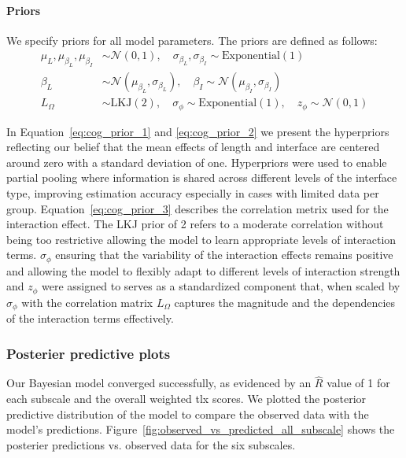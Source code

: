 \paragraph{Priors}
We specify priors for all model parameters. The priors are defined as follows:
\begin{align}
    \mu_{L}, \mu_{\beta_L}, \mu_{\beta_I} &\sim \mathcal{N}(0, 1), \quad \sigma_{\beta_L}, \sigma_{\beta_I} \sim \text{Exponential}(1) \label{eq:cog_prior_1} \\
    \beta_L &\sim \mathcal{N}(\mu_{\beta_L}, \sigma_{\beta_L}), \quad \beta_I \sim \mathcal{N}(\mu_{\beta_I}, \sigma_{\beta_I}) \label{eq:cog_prior_2} \\
    L_{\Omega} &\sim \text{LKJ}(2), \quad \sigma_{\phi} \sim \text{Exponential}(1), \quad z_{\phi} \sim \mathcal{N}(0, 1) \label{eq:cog_prior_3} 
\end{align}

In Equation~\ref{eq:cog_prior_1} and \ref{eq:cog_prior_2} we present the hyperpriors reflecting our belief that the mean effects of length and interface are centered around zero with a standard deviation of one. Hyperpriors were used to enable partial pooling where information is shared across different levels of the interface type, improving estimation accuracy especially in cases with limited data per group. Equation~\ref{eq:cog_prior_3} describes the correlation metrix used for the interaction effect. The LKJ prior of 2 refers to a moderate correlation without being too restrictive allowing the model to learn appropriate levels of interaction terms. $\sigma_{\phi}$ ensuring that the variability of the interaction effects remains positive and allowing the model to flexibly adapt to different levels of interaction strength and $z_{\phi}$ were assigned to serves as a standardized component that, when scaled by $\sigma_{\phi}$ with the correlation matrix $L_{\Omega}$ captures the magnitude and the dependencies of the interaction terms effectively.

\subsubsection{Posterier predictive plots}
Our Bayesian model converged successfully, as evidenced by an $\hat{R}$ value of 1 for each subscale and the overall weighted tlx scores. We plotted the posterior predictive distribution of the model to compare the observed data with the model's predictions. Figure~\ref{fig:observed_vs_predicted_all_subscale} shows the posterier predictions vs. observed data for the six subscales.

